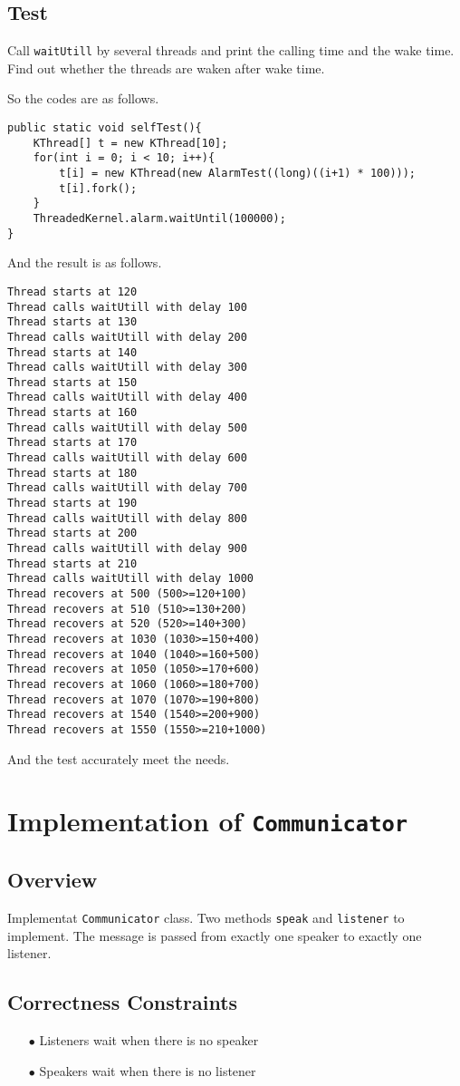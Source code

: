 \documentclass{article}
\begin{document}
 \subsection{Test}
 Call \texttt{waitUtill} by several threads and print the calling time and the wake time. Find out whether the threads are waken after wake time. 
 
 So the codes are as follows.
 \begin{lstlisting}
public static void selfTest(){
	KThread[] t = new KThread[10];
	for(int i = 0; i < 10; i++){
		t[i] = new KThread(new AlarmTest((long)((i+1) * 100)));
		t[i].fork();
	}
	ThreadedKernel.alarm.waitUntil(100000);
}
 \end{lstlisting}
 
 And the result is as follows.
\begin{lstlisting}
Thread starts at 120
Thread calls waitUtill with delay 100
Thread starts at 130
Thread calls waitUtill with delay 200
Thread starts at 140
Thread calls waitUtill with delay 300
Thread starts at 150
Thread calls waitUtill with delay 400
Thread starts at 160
Thread calls waitUtill with delay 500
Thread starts at 170
Thread calls waitUtill with delay 600
Thread starts at 180
Thread calls waitUtill with delay 700
Thread starts at 190
Thread calls waitUtill with delay 800
Thread starts at 200
Thread calls waitUtill with delay 900
Thread starts at 210
Thread calls waitUtill with delay 1000
Thread recovers at 500 (500>=120+100)
Thread recovers at 510 (510>=130+200)
Thread recovers at 520 (520>=140+300)
Thread recovers at 1030 (1030>=150+400)
Thread recovers at 1040 (1040>=160+500)
Thread recovers at 1050 (1050>=170+600)
Thread recovers at 1060 (1060>=180+700)
Thread recovers at 1070 (1070>=190+800)
Thread recovers at 1540 (1540>=200+900)
Thread recovers at 1550 (1550>=210+1000)
\end{lstlisting}

And the test accurately meet the needs.
\section{Implementation of \texttt{Communicator}}
\subsection{Overview}
Implementat \texttt{Communicator} class. Two methods \texttt{speak} and \texttt{listener} to implement. The message is passed from exactly one 
speaker to exactly one listener.
\subsection{Correctness Constraints}
\begin{enumerate}
	\item[$\bullet$] Listeners wait when there is no speaker
	\item[$\bullet$] Speakers wait when there is no listener
\end{enumerate}
\end{document}

